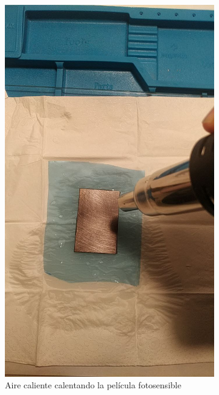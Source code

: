 \begin{figure}[!htb]
\begin{subfigure}[b]{.475\textwidth}
        \includegraphics[width=1\textwidth, trim={0 400 0 500}, clip]{tfg/figuras/06_prototipado/pelicula/aire_caliente.png}
        \caption{Aire caliente calentando la película fotosensible}
        \label{fig:06:aire}
    \end{subfigure}%
    \hfill
    \begin{subfigure}[b]{.475\textwidth}
        \centering

\end{subfigure}
\end{figure}

